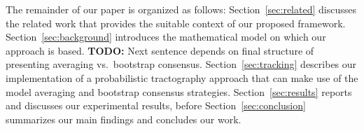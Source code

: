 


The remainder of our paper is organized as follows: Section~\ref{sec:related} discusses the related work that provides the suitable context of our proposed framework. Section~\ref{sec:background} introduces the mathematical model on which our approach is based. \textbf{TODO:} Next sentence depends on final structure of presenting averaging vs.\ bootstrap consensus. Section~\ref{sec:tracking} describes our implementation of a probabilistic tractography approach that can make use of the model averaging and bootstrap consensus strategies. Section~\ref{sec:results} reports and discusses our experimental results, before Section~\ref{sec:conclusion} summarizes our main findings and concludes our work.


